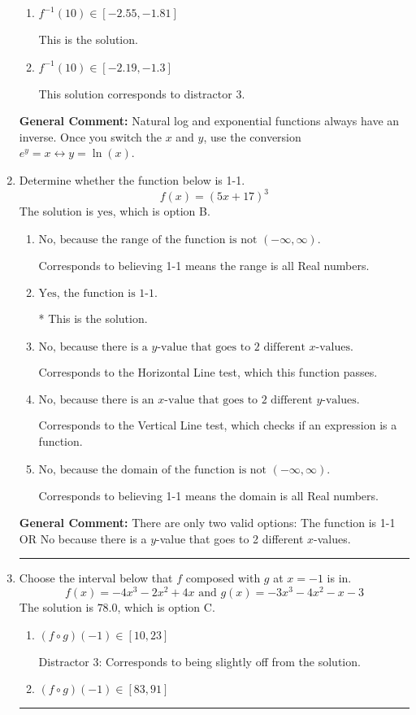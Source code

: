 \documentclass{extbook}[14pt]
\newcommand{\litem}[1]{\item #1

\rule{\textwidth}{0.4pt}}
\begin{document}
\begin{enumerate}
{\begin{enumerate}[label=\Alph*.]
 This solution corresponds to distractor 4.
\item \( f^{-1}(10) \in [-2.55, -1.81] \)

 This is the solution.
\item \( f^{-1}(10) \in [-2.19, -1.3] \)

 This solution corresponds to distractor 3.
\end{enumerate}

\textbf{General Comment:} Natural log and exponential functions always have an inverse. Once you switch the $x$ and $y$, use the conversion $ e^y = x \leftrightarrow y=\ln(x)$.
}
\litem{
Determine whether the function below is 1-1.
\[ f(x) = (5 x + 17)^3 \]The solution is \( \text{yes} \), which is option B.\begin{enumerate}[label=\Alph*.]
\item \( \text{No, because the range of the function is not $(-\infty, \infty)$.} \)

Corresponds to believing 1-1 means the range is all Real numbers.
\item \( \text{Yes, the function is 1-1.} \)

* This is the solution.
\item \( \text{No, because there is a $y$-value that goes to 2 different $x$-values.} \)

Corresponds to the Horizontal Line test, which this function passes.
\item \( \text{No, because there is an $x$-value that goes to 2 different $y$-values.} \)

Corresponds to the Vertical Line test, which checks if an expression is a function.
\item \( \text{No, because the domain of the function is not $(-\infty, \infty)$.} \)

Corresponds to believing 1-1 means the domain is all Real numbers.
\end{enumerate}

\textbf{General Comment:} There are only two valid options: The function is 1-1 OR No because there is a $y$-value that goes to 2 different $x$-values.
}
\litem{
Choose the interval below that $f$ composed with $g$ at $x=-1$ is in.
\[ f(x) = -4x^{3} -2 x^{2} +4 x \text{ and } g(x) = -3x^{3} -4 x^{2} -x -3 \]The solution is \( 78.0 \), which is option C.\begin{enumerate}[label=\Alph*.]
\item \( (f \circ g)(-1) \in [10, 23] \)

 Distractor 3: Corresponds to being slightly off from the solution.
\item \( (f \circ g)(-1) \in [83, 91] \)


\end{enumerate}}
\end{enumerate}
\end{document}
